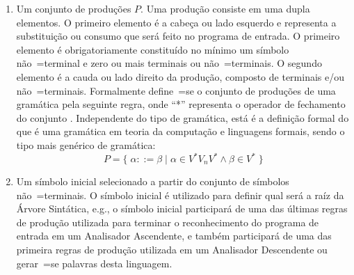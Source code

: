 \begin{enumerate}
    \item \label{item:definicaoDeGramatica}Um conjunto de produções $P$.
    Uma produção consiste em uma dupla elementos.
    O primeiro elemento é a cabeça ou
    lado esquerdo e
    representa a substituição ou
    consumo que será feito no programa de entrada.
    O primeiro elemento é obrigatoriamente constituído no mínimo um símbolo não~=terminal e
    zero ou mais terminais ou
    não~=terminais.
    O segundo elemento é a cauda ou
    lado direito da produção,
    composto de terminais e\slash{}ou não~=terminais.
    Formalmente define~=se o conjunto de produções de uma gramática pela seguinte regra,
    onde ``*'' representa o operador de fechamento do conjunto \cite{hopcroftBook}.
    Independente do tipo de gramática,
    está é a definição formal do que é uma gramática em teoria da computação e
    linguagens formais,
    sendo o tipo mais genérico de gramática:
    $$P = \{\; \alpha ::= \beta \;|\; \alpha \in V^* V_n V^* \land \beta \in V^* \;\}$$

    \item Um símbolo inicial selecionado a partir do conjunto de símbolos não~=terminais.
    O símbolo inicial é utilizado para definir qual será a raíz da Árvore Sintática,
    e.g.,
    o símbolo inicial participará de uma das últimas regras de produção utilizada para terminar o reconhecimento do programa de entrada em um Analisador Ascendente,
    e também participará de uma das primeira regras de produção utilizada em um Analisador Descendente ou
    gerar~=se palavras desta linguagem.
\end{enumerate}

